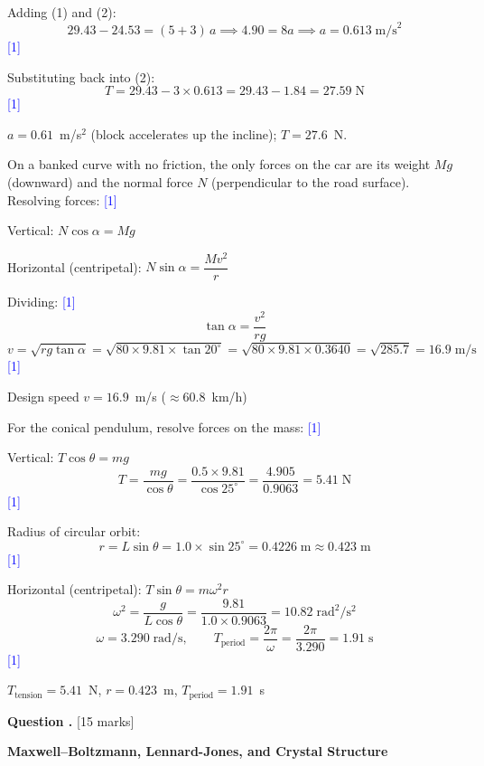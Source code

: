 \documentclass[12pt,a4paper]{article}
\newcounter{questioncounter}
\newcommand{\question}[1]{%
  \stepcounter{questioncounter}%
  \vspace{0.5cm}%
  \noindent\textbf{Question \thequestioncounter.} \hfill [#1 marks]%
  \vspace{0.2cm}%
  \par%
}
\newcommand{\markstep}[1]{\hfill\textcolor{blue}{[#1]}}
\newcommand{\finalanswer}[1]{%
  \begin{tcolorbox}[colback=green!5!white,colframe=green!50!black,boxrule=0.5pt]
  #1
  \end{tcolorbox}
}
\begin{document}
\begin{parts}
Adding (1) and (2):
\[
29.43 - 24.53 = (5 + 3)\,a \implies 4.90 = 8a \implies a = 0.613\;\text{m/s}^2
\]
\markstep{1}

Substituting back into (2):
\[
T = 29.43 - 3 \times 0.613 = 29.43 - 1.84 = 27.59\;\text{N}
\]
\markstep{1}

\finalanswer{$a = 0.61$~m/s$^2$ (block accelerates up the incline); $T = 27.6$~N.}

\item On a banked curve with no friction, the only forces on the car are its weight $Mg$ (downward) and the normal force $N$ (perpendicular to the road surface). Resolving forces: \markstep{1}

Vertical: $N\cos\alpha = Mg$

Horizontal (centripetal): $N\sin\alpha = \dfrac{Mv^2}{r}$

Dividing: \markstep{1}
\[
\tan\alpha = \frac{v^2}{rg}
\]
\[
v = \sqrt{rg\tan\alpha} = \sqrt{80 \times 9.81 \times \tan 20^\circ} = \sqrt{80 \times 9.81 \times 0.3640} = \sqrt{285.7} = 16.9\;\text{m/s}
\]
\markstep{1}

\finalanswer{Design speed $v = 16.9$~m/s ($\approx 60.8$~km/h)}

\item For the conical pendulum, resolve forces on the mass: \markstep{1}

Vertical: $T\cos\theta = mg$
\[
T = \frac{mg}{\cos\theta} = \frac{0.5 \times 9.81}{\cos 25^\circ} = \frac{4.905}{0.9063} = 5.41\;\text{N}
\]
\markstep{1}

Radius of circular orbit:
\[
r = L\sin\theta = 1.0 \times \sin 25^\circ = 0.4226\;\text{m} \approx 0.423\;\text{m}
\]
\markstep{1}

Horizontal (centripetal): $T\sin\theta = m\omega^2 r$
\[
\omega^2 = \frac{g}{L\cos\theta} = \frac{9.81}{1.0 \times 0.9063} = 10.82\;\text{rad}^2/\text{s}^2
\]
\[
\omega = 3.290\;\text{rad/s}, \qquad T_{\text{period}} = \frac{2\pi}{\omega} = \frac{2\pi}{3.290} = 1.91\;\text{s}
\]
\markstep{1}

\finalanswer{$T_{\text{tension}} = 5.41$~N, \quad $r = 0.423$~m, \quad $T_{\text{period}} = 1.91$~s}
\end{parts}

\newpage

\question{15}

\noindent\textbf{Maxwell--Boltzmann, Lennard-Jones, and Crystal Structure}
\end{document}
